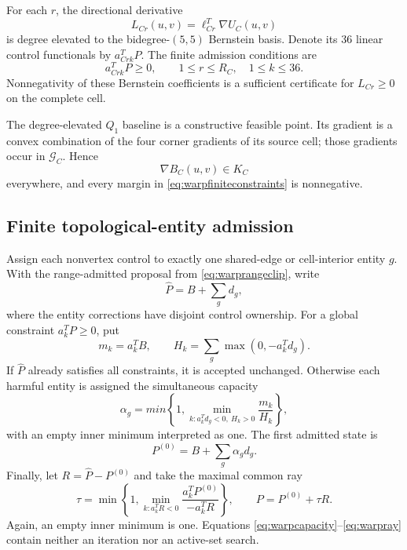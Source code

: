 \documentclass[journal]{IEEEtran}
\begin{document}
For each \(r\), the directional derivative
\begin{equation}
 L_{Cr}(u,v)=\ell_{Cr}^T\nabla U_C(u,v)
 \label{eq:warpdirectional}
\end{equation}
is degree elevated to the bidegree-\((5,5)\) Bernstein basis.  Denote its 36
linear control functionals by \(a_{Crk}^TP\).  The finite admission
conditions are
\begin{equation}
 a_{Crk}^TP\geq0,\qquad
 1\leq r\leq R_C,\quad 1\leq k\leq36.
 \label{eq:warpfiniteconstraints}
\end{equation}
Nonnegativity of these Bernstein coefficients is a sufficient certificate
for \(L_{Cr}\geq0\) on the complete cell.

The degree-elevated \(Q_1\) baseline is a constructive feasible point.  Its
gradient is a convex combination of the four corner gradients of its source
cell; those gradients occur in \(\mathcal G_C\).  Hence
\begin{equation}
 \nabla B_C(u,v)\in K_C
 \label{eq:warpbaselinefeasible}
\end{equation}
everywhere, and every margin in \eqref{eq:warpfiniteconstraints} is
nonnegative.

\subsection{Finite topological-entity admission}

Assign each nonvertex control to exactly one shared-edge or cell-interior
entity \(g\).  With the range-admitted proposal from
\eqref{eq:warprangeclip}, write
\begin{equation}
 \widehat P=B+\sum_gd_g,
 \label{eq:warpgroups}
\end{equation}
where the entity corrections have disjoint control ownership.  For a global
constraint \(a_k^TP\geq0\), put
\begin{equation}
 m_k=a_k^TB,\qquad
 H_k=\sum_g\max(0,-a_k^Td_g).
 \label{eq:warpmargin}
\end{equation}
If \(\widehat P\) already satisfies all constraints, it is accepted
unchanged.  Otherwise each harmful entity is assigned the simultaneous
capacity
\begin{equation}
 \alpha_g=min\!\left\{1,
  \min_{k:a_k^Td_g<0,\ H_k>0}\frac{m_k}{H_k}\right\},
 \label{eq:warpcapacity}
\end{equation}
with an empty inner minimum interpreted as one.  The first admitted state is
\begin{equation}
 P^{(0)}=B+\sum_g\alpha_gd_g.
 \label{eq:warpfirststate}
\end{equation}
Finally, let \(R=\widehat P-P^{(0)}\) and take the maximal common ray
\begin{equation}
 \tau=\min\!\left\{1,
   \min_{k:a_k^TR<0}
   \frac{a_k^TP^{(0)}}{-a_k^TR}\right\},
 \qquad P=P^{(0)}+\tau R.
 \label{eq:warpray}
\end{equation}
Again, an empty inner minimum is one.  Equations
\eqref{eq:warpcapacity}--\eqref{eq:warpray} contain neither an iteration nor
an active-set search.
\end{document}
